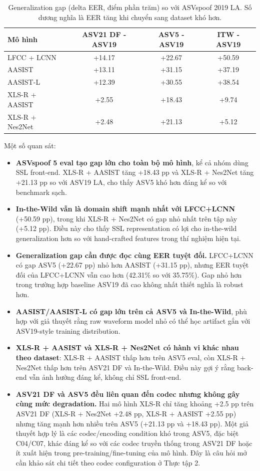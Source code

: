 \begin{table}[H]
    \centering
    \begin{tabular}{l|c|c|c}
        \textbf{Mô hình} & \textbf{ASV21 DF - ASV19} & \textbf{ASV5 - ASV19} & \textbf{ITW - ASV19}
        \\ \hline
        LFCC + LCNN & +14.17 & +22.67 & +50.59
        \\ \hline
        AASIST & +13.11 & +31.15 & +37.19
        \\ \hline
        AASIST-L & +12.39 & +30.55 & +38.54
        \\ \hline
        XLS-R + AASIST & +2.55 & +18.43 & +9.74
        \\ \hline
        XLS-R + Nes2Net & +2.48 & +21.13 & +5.12
    \end{tabular}
    \caption{Generalization gap (delta EER, điểm phần trăm) so với ASVspoof 2019 LA. Số dương nghĩa là EER tăng khi chuyển sang dataset khó hơn.}
    \label{tab:generalization-gap}
\end{table}

Một số quan sát:
\begin{itemize}
    \item \textbf{ASVspoof 5 eval tạo gap lớn cho toàn bộ mô hình}, kể cả nhóm dùng SSL front-end. XLS-R + AASIST tăng +18.43 pp và XLS-R + Nes2Net tăng +21.13 pp so với ASV19 LA, cho thấy ASV5 khó hơn đáng kể so với benchmark sạch.
    \item \textbf{In-the-Wild vẫn là domain shift mạnh nhất với LFCC+LCNN} (+50.59 pp), trong khi XLS-R + Nes2Net có gap nhỏ nhất trên tập này (+5.12 pp). Điều này cho thấy SSL representation có lợi cho in-the-wild generalization hơn so với hand-crafted features trong thí nghiệm hiện tại.
    \item \textbf{Generalization gap cần được đọc cùng EER tuyệt đối.} LFCC+LCNN có gap ASV5 (+22.67 pp) nhỏ hơn AASIST (+31.15 pp), nhưng EER tuyệt đối của LFCC+LCNN vẫn cao hơn (42.31\% so với 35.75\%). Gap nhỏ hơn trong trường hợp baseline ASV19 đã cao không nhất thiết nghĩa là robust hơn.
    \item \textbf{AASIST/AASIST-L có gap lớn trên cả ASV5 và In-the-Wild}, phù hợp với giả thuyết rằng raw waveform model nhỏ có thể học artifact gắn với ASV19-style training distribution.
    \item \textbf{XLS-R + AASIST và XLS-R + Nes2Net có hành vi khác nhau theo dataset}: XLS-R + AASIST thấp hơn trên ASV5 eval, còn XLS-R + Nes2Net thấp hơn trên ASV21 DF và In-the-Wild. Điều này gợi ý rằng back-end vẫn ảnh hưởng đáng kể, không chỉ SSL front-end.
    \item \textbf{ASV21 DF và ASV5 đều liên quan đến codec nhưng không gây cùng mức degradation.} Hai mô hình XLS-R chỉ tăng khoảng +2.5 pp trên ASV21 DF (XLS-R + Nes2Net +2.48 pp, XLS-R + AASIST +2.55 pp) nhưng tăng mạnh hơn nhiều trên ASV5 (+21.13 pp và +18.43 pp). Một giả thuyết hợp lý là các codec/encoding condition khó trong ASV5, đặc biệt C04/C07, khác đáng kể so với các codec truyền thống trong ASV21 DF hoặc ít xuất hiện trong pre-training/fine-tuning của mô hình. Đây là câu hỏi mở cần khảo sát chi tiết theo codec configuration ở Thực tập 2.
\end{itemize}

